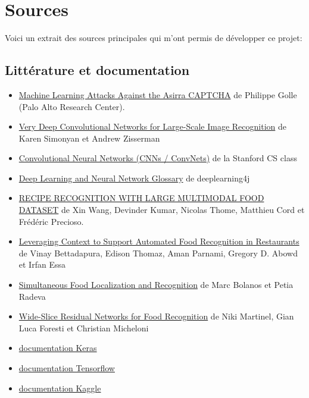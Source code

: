\documentclass[a4paper,12pt]{report}
\begin{document}
    \newpage

    \section{Sources}
    Voici un extrait des sources principales qui m'ont permis de développer ce projet:

      \subsection{Littérature et documentation}
      \begin{itemize}
        \item \href{http://xenon.stanford.edu/~pgolle/papers/dogcat.pdf}{Machine Learning Attacks Against the Asirra CAPTCHA} de Philippe Golle (Palo Alto Research Center).
        \item \href{https://arxiv.org/abs/1409.1556}{Very Deep Convolutional Networks for Large-Scale Image Recognition} de Karen Simonyan et Andrew Zisserman
        \item \href{https://cs231n.github.io/convolutional-networks/}{Convolutional Neural Networks (CNNs / ConvNets)} de la Stanford CS class
        \item \href{https://deeplearning4j.org/glossary}{Deep Learning and Neural Network Glossary} de deeplearning4j
        \item \href{http://webia.lip6.fr/~cord/pdfs/publis/CordCooking2015icme.pdf}{RECIPE RECOGNITION WITH LARGE MULTIMODAL FOOD DATASET} de Xin Wang, Devinder Kumar, Nicolas Thome, Matthieu Cord et Frédéric Precioso.
        \item \href{https://arxiv.org/pdf/1510.02078v1.pdf}{Leveraging Context to Support Automated Food Recognition in Restaurants} de Vinay Bettadapura, Edison Thomaz, Aman Parnami, Gregory D. Abowd et Irfan Essa
        \item \href{https://arxiv.org/pdf/1604.07953v2.pdf}{Simultaneous Food Localization and Recognition} de Marc Bolanos et Petia Radeva
        \item \href{https://arxiv.org/pdf/1612.06543v1.pdf}{Wide-Slice Residual Networks for Food Recognition} de Niki Martinel, Gian Luca Foresti et Christian Micheloni
        \item \href{https://keras.io/}{documentation Keras}
        \item \href{https://www.tensorflow.org/get\_started/get\_started}{documentation Tensorflow}
        \item \href{https://www.kaggle.com/wiki/Home}{documentation Kaggle }
      \end{itemize}
\end{document}
